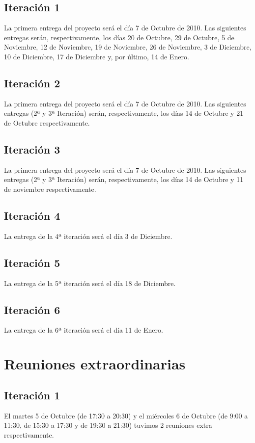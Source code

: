 \documentclass[11 pt]{book}
\begin{document}
        \subsection*{Iteración 1}
            La primera entrega del proyecto será el día 7 de Octubre de 2010. Las siguientes entregas serán, respectivamente, los días 20 de Octubre, 29 de Octubre, 5 de Noviembre, 12 de Noviembre, 19 de Noviembre, 26 de Noviembre, 3 de Diciembre, 10 de Diciembre, 17 de Diciembre y, por último, 14 de Enero.
            
        \subsection*{Iteración 2}
            La primera entrega del proyecto será el día 7 de Octubre de 2010. Las siguientes entregas (2ª y 3ª Iteración) serán, respectivamente, los días 14 de Octubre y 21 de Octubre respectivamente.
            
        \subsection*{Iteración 3}
	        La primera entrega del proyecto será el día 7 de Octubre de 2010. Las siguientes entregas (2ª y 3ª Iteración) serán, respectivamente, los días 14 de Octubre y 11 de noviembre respectivamente.

		\subsection*{Iteración 4}
			La entrega de la 4ª iteración será el día 3 de Diciembre.
			
		\subsection*{Iteración 5}
			La entrega de la 5ª iteración será el día 18 de Diciembre.
			
		\subsection*{Iteración 6}
			La entrega de la 6ª iteración será el día 11 de Enero.
			
	\section{Reuniones extraordinarias}
	    \subsection*{Iteración 1}
		    El martes 5 de Octubre (de 17:30 a 20:30) y el miércoles 6 de Octubre (de 9:00 a 11:30, de 15:30 a 17:30 y de 19:30 a 21:30) tuvimos 2 reuniones extra respectivamente.
\end{document}
